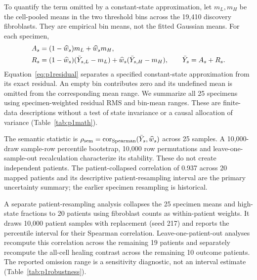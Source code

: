 To quantify the term omitted by a constant-state approximation, let $m_L,m_H$ be the cell-pooled means in the two threshold bins across the 19,410 discovery fibroblasts. They are empirical bin means, not the fitted Gaussian means. For each specimen,
\begin{align}
A_s&=(1-\widehat w_s)m_L+\widehat w_sm_H,\notag\\
R_s&=(1-\widehat w_s)(\bar Y_{s,L}-m_L)+\widehat w_s(\bar Y_{s,H}-m_H),\qquad \bar Y_s=A_s+R_s.\label{eq:p1residual}
\end{align}
Equation~\eqref{eq:p1residual} separates a specified constant-state approximation from its exact residual. An empty bin contributes zero and its undefined mean is omitted from the corresponding mean range. We summarize all 25 specimens using specimen-weighted residual RMS and bin-mean ranges. These are finite-data descriptions without a test of state invariance or a causal allocation of variance (Table~\ref{tab:p1math}).

The semantic statistic is $\rho_{\rm sem}=\operatorname{cor}_{\rm Spearman}(\bar Y_s,\widehat w_s)$ across 25 samples. A 10,000-draw sample-row percentile bootstrap, 10,000 row permutations and leave-one-sample-out recalculation characterize its stability. These do not create independent patients. The patient-collapsed correlation of 0.937 across 20 mapped patients and its descriptive patient-resampling interval are the primary uncertainty summary; the earlier specimen resampling is historical.

A separate patient-resampling analysis collapses the 25 specimen means and high-state fractions to 20 patients using fibroblast counts as within-patient weights. It draws 10,000 patient samples with replacement (seed 217) and reports the percentile interval for their Spearman correlation. Leave-one-patient-out analyses recompute this correlation across the remaining 19 patients and separately recompute the all-cell healing contrast across the remaining 10 outcome patients. The reported omission range is a sensitivity diagnostic, not an interval estimate (Table~\ref{tab:p1robustness}).


